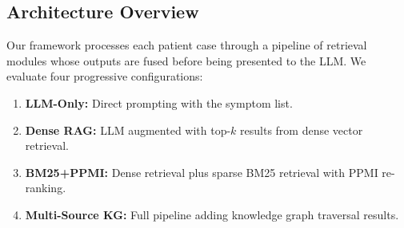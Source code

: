 \documentclass[preprint,12pt]{elsarticle}
\begin{document}
\subsection{Architecture Overview}

Our framework processes each patient case through a pipeline of retrieval modules whose outputs are fused before being presented to the LLM. We evaluate four progressive configurations:

\begin{enumerate}
    \item \textbf{LLM-Only:} Direct prompting with the symptom list.
    \item \textbf{Dense RAG:} LLM augmented with top-$k$ results from dense vector retrieval.
    \item \textbf{BM25+PPMI:} Dense retrieval plus sparse BM25 retrieval with PPMI re-ranking.
    \item \textbf{Multi-Source KG:} Full pipeline adding knowledge graph traversal results.
\end{enumerate}
\end{document}
